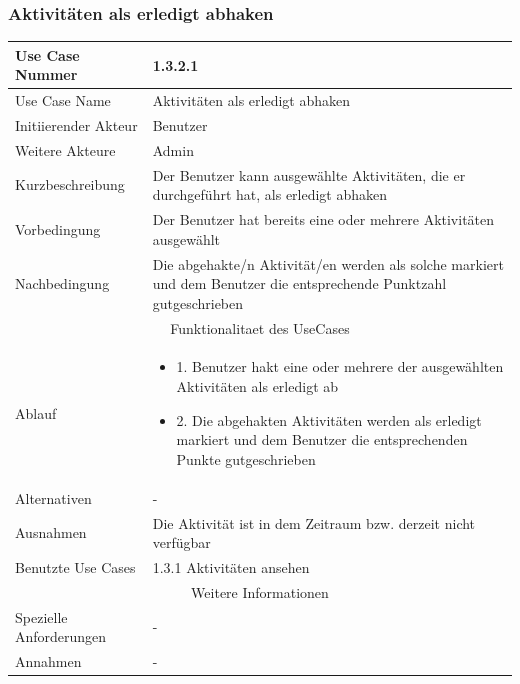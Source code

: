 \documentclass[10pt,a4paper]{article}
\begin{document}
	\subsubsection{Aktivit\"aten als erledigt abhaken}
	\begin{tabular}{|l|p{.5\linewidth}|}
	\hline Use Case Nummer & 1.3.2.1 \\ 
	\hline Use Case Name & Aktivit\"aten als erledigt abhaken \\ 
	\hline Initiierender Akteur & Benutzer \\
	\hline Weitere Akteure & Admin \\
	\hline Kurzbeschreibung & Der Benutzer kann ausgew\"ahlte Aktivit\"aten, die er durchgef\"uhrt hat, als erledigt abhaken \\
	\hline Vorbedingung & Der Benutzer hat bereits eine oder mehrere Aktivit\"aten ausgew\"ahlt \\
	\hline Nachbedingung & Die abgehakte/n Aktivit\"at/en werden als solche markiert und dem Benutzer die entsprechende Punktzahl gutgeschrieben \\
	\hline \multicolumn{2}{|c|}{Funktionalitaet des UseCases}\\
	\hline Ablauf & \begin{itemize}
			\item 1. Benutzer hakt eine oder mehrere der ausgew\"ahlten Aktivit\"aten als erledigt ab
			\item 2. Die abgehakten Aktivit\"aten werden als erledigt markiert und dem Benutzer die entsprechenden Punkte gutgeschrieben
		\end{itemize} \\
	\hline Alternativen & - \\
	\hline Ausnahmen & Die Aktivit\"at ist in dem Zeitraum bzw. derzeit nicht verf\"ugbar \\
	\hline Benutzte Use Cases & 1.3.1 Aktivit\"aten ansehen \\
	\hline \multicolumn{2}{|c|}{Weitere Informationen} \\
	\hline Spezielle Anforderungen & - \\
	\hline Annahmen & - \\
	\hline
	\end{tabular} 
	
\end{document}
